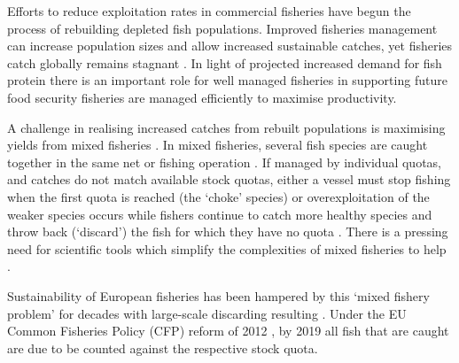 \documentclass{nature}
\begin{document}
\begin{linenumbers}
 Efforts to reduce exploitation rates in commercial fisheries
have begun the process of rebuilding depleted fish populations\cite{Worm2009}.
Improved fisheries management  can increase
population sizes and allow increased sustainable catches, yet fisheries catch
globally remains stagnant . In light of projected
increased demand for fish protein  there is an
important role for well managed fisheries in supporting future food security
\cite{Mcclanahan2015}  
 fisheries
are managed efficiently to maximise productivity.

A  challenge in realising increased catches
from rebuilt populations is maximising yields from mixed fisheries
\cite{Branch2008, Kuriyama2016, Ulrich2016}. In mixed fisheries,  several fish species are caught
together in the same net or fishing operation . If managed by individual quotas, and catches do not
match available stock quotas, either a vessel must stop fishing when the first
quota is reached (the `choke' species) or overexploitation of the weaker
species occurs while fishers continue to catch more healthy species and throw
back (`discard') the fish for which they have no quota \cite{Batsleer2015}.
There is a pressing need for scientific tools which
simplify the complexities of mixed fisheries to help . 

Sustainability of European fisheries has been hampered by this `mixed fishery
problem' for decades with large-scale discarding resulting \cite{Uhlmann2014}.
 Under the EU Common Fisheries
Policy (CFP) reform of 2012 , by 2019 all fish that are caught are due to be
counted against the respective stock quota. 


\end{linenumbers}
\end{document}

